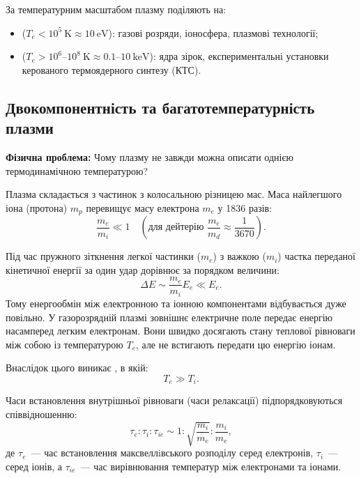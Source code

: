За температурним масштабом плазму поділяють на:
\begin{itemize}
	\item {} ($T_e < 10^5~\mathrm{K} \approx 10~\mathrm{eV}$): газові розряди, іоносфера, плазмові технології;
	\item {} ($T_e > 10^6$--$10^8~\mathrm{K} \approx 0.1$--$10~\mathrm{keV}$): ядра зірок, експериментальні установки керованого термоядерного синтезу (КТС).
\end{itemize}

\subsection{Двокомпонентність та багатотемпературність плазми}

\textbf{Фізична проблема:} Чому плазму не завжди можна описати однією термодинамічною температурою?

Плазма складається з частинок з колосальною різницею мас. Маса найлегшого іона (протона) $m_p$ перевищує масу електрона $m_e$ у 1836 разів:
\begin{equation}
	\frac{m_e}{m_i} \ll 1 \quad \left(\text{для дейтерію } \frac{m_e}{m_d} \approx \frac{1}{3670}\right).
\end{equation}

Під час пружного зіткнення легкої частинки ($m_e$) з важкою ($m_i$) частка переданої кінетичної енергії за один удар дорівнює за порядком величини:
\begin{equation}
	\Delta E \sim \frac{m_e}{m_i} E_e \ll E_e.
\end{equation}
Тому енергообмін між електронною та іонною компонентами відбувається дуже повільно. У газорозрядній плазмі зовнішнє електричне поле передає енергію насамперед легким електронам. Вони швидко досягають стану теплової рівноваги між собою із температурою $T_e$, але не встигають передати цю енергію іонам.

Внаслідок цього виникає , в якій:
\begin{equation}
	T_e \gg T_i.
\end{equation}

Часи встановлення внутрішньої рівноваги (часи релаксації) підпорядковуються співвідношенню:
\begin{equation}\label{eq:relaxation-times-ratio}
	\tau_e : \tau_i : \tau_{ie} \sim 1 : \sqrt{\frac{m_i}{m_e}} : \frac{m_i}{m_e},
\end{equation}
де $\tau_e$~--- час встановлення максвеллiвського розподілу серед електронів, $\tau_i$~--- серед іонів, а $\tau_{ie}$~--- час вирівнювання температур між електронами та іонами.


